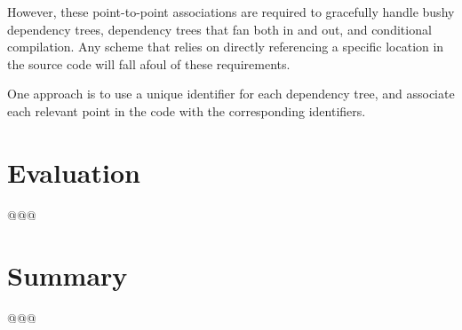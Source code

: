 \documentclass[letterpaper,twocolumn,10pt]{article}
\begin{document}
However, these point-to-point associations are required to gracefully handle
bushy dependency trees, dependency trees that fan both in and out,
and conditional compilation.
Any scheme that relies on directly referencing a specific location
in the source code will fall afoul of these requirements.

One approach is to use a unique identifier for each dependency tree,
and associate each relevant point in the code with the corresponding
identifiers.

\section{Evaluation}
\label{sec:Evaluation}

@@@

\section{Summary}
\label{sec:Summary}

@@@

%
%

%







\end{document}
